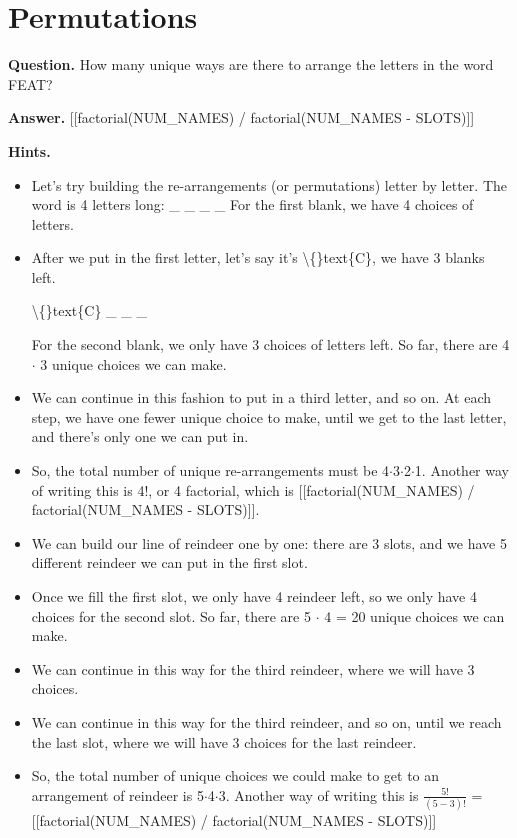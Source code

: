 \documentclass{article}
\begin{document}
\section*{Permutations}
\textbf{Question.} How many unique ways are there to arrange the letters in the word FEAT?

\textbf{Answer.} [[factorial(NUM\_NAMES) / factorial(NUM\_NAMES - SLOTS)]]

\textbf{Hints.}
\begin{itemize}
  \item Let's try building the re-arrangements (or permutations) letter by letter.
                            The word is 4 letters long:
                        \_ \_ \_ \_ 
                        For the first blank, we have 4 choices of letters.
  \item After we put in the first letter, let's say it's \textbackslash\{\}text\{C\},
                            we have 3 blanks left.
                        
                        \textbackslash\{\}text\{C\} \_ \_ \_ 
                        
                            For the second blank, we only have 3 choices of letters left.
                            So far, there are 4 $\cdot$ 3 unique choices we can make.
  \item We can continue in this fashion to put in a third letter, and so on.
                        At each step, we have one fewer unique choice to make, until we get to the last letter, and there's only one we can put in.
  \item So, the total number of unique re-arrangements must be
                        4$\cdot$3$\cdot$2$\cdot$1.
                        Another way of writing this is 4!,
                        or 4 factorial, which is [[factorial(NUM\_NAMES) / factorial(NUM\_NAMES - SLOTS)]].
  \item We can build our line of reindeer one by one: there are 3 slots,
                        and we have 5 different reindeer we can put in the first slot.
  \item Once we fill the first slot, we only have 4 reindeer left,
                        so we only have 4 choices for the second slot.
                        So far, there are 5 $\cdot$ 4 = 20
                        unique choices we can make.
  \item We can continue in this way for the third reindeer, where we will have 3 choices.
  \item We can continue in this way for the third reindeer, and so on, until we reach the last slot, where we will
                        have 3 choices for the last reindeer.
  \item So, the total number of unique choices we could make to get to an arrangement of reindeer is
                        5$\cdot$4$\cdot$3.
                        Another way of writing this is
                        $\frac{5!}{(5-3)!}$ = [[factorial(NUM\_NAMES) / factorial(NUM\_NAMES - SLOTS)]]
\end{itemize}
\end{document}
